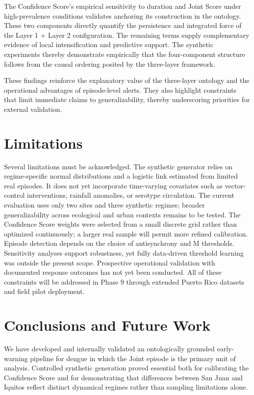 \documentclass[11pt,a4paper]{article}
\begin{document}
The Confidence Score's empirical sensitivity to duration and Joint Score under high-prevalence conditions validates anchoring its construction in the ontology. These two components directly quantify the persistence and integrated force of the Layer 1 + Layer 2 configuration. The remaining terms supply complementary evidence of local intensification and predictive support. The synthetic experiments thereby demonstrate empirically that the four-component structure follows from the causal ordering posited by the three-layer framework.

These findings reinforce the explanatory value of the three-layer ontology and the operational advantages of episode-level alerts. They also highlight constraints that limit immediate claims to generalizability, thereby underscoring priorities for external validation.

\section{Limitations}

Several limitations must be acknowledged. The synthetic generator relies on regime-specific normal distributions and a logistic link estimated from limited real episodes. It does not yet incorporate time-varying covariates such as vector-control interventions, rainfall anomalies, or serotype circulation. The current evaluation uses only two sites and three synthetic regimes; broader generalizability across ecological and urban contexts remains to be tested. The Confidence Score weights were selected from a small discrete grid rather than optimized continuously; a larger real sample will permit more refined calibration. Episode detection depends on the choice of antisynchrony and M thresholds. Sensitivity analyses support robustness, yet fully data-driven threshold learning was outside the present scope. Prospective operational validation with documented response outcomes has not yet been conducted. All of these constraints will be addressed in Phase 9 through extended Puerto Rico datasets and field pilot deployment.

\section{Conclusions and Future Work}

We have developed and internally validated an ontologically grounded early-warning pipeline for dengue in which the Joint episode is the primary unit of analysis. Controlled synthetic generation proved essential both for calibrating the Confidence Score and for demonstrating that differences between San Juan and Iquitos reflect distinct dynamical regimes rather than sampling limitations alone.
\end{document}
